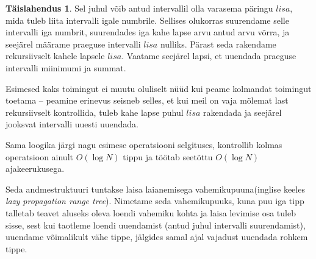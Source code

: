 \documentclass{trkut}
\theoremstyle{definition}
\newtheorem*{solution}{Täislahendus}
\begin{document}
\begin{solution}
Sel juhul võib antud intervallil olla varasema päringu $lisa$, mida tuleb liita intervalli igale numbrile. Sellises olukorras suurendame selle intervalli iga numbrit, suurendades iga kahe lapse arvu antud arvu võrra, ja seejärel määrame praeguse intervalli $lisa$ nulliks. Pärast seda rakendame rekursiivselt kahele lapsele $lisa$. Vaatame seejärel lapsi, et uuendada praeguse intervalli miinimumi ja summat.

Esimesed kaks toimingut ei muutu oluliselt nüüd kui peame kolmandat toimingut toetama -- peamine erinevus seisneb selles, et kui meil on vaja mõlemat last rekursiivselt kontrollida, tuleb kahe lapse puhul $lisa$ rakendada ja seejärel jooksvat intervalli uuesti uuendada.

Sama loogika järgi nagu esimese operatsiooni selgituses, kontrollib kolmas operatsioon ainult $O(\log N)$ tippu ja töötab seetõttu $O(\log N)$ ajakeerukusega.

Seda andmestruktuuri tuntakse laisa laianemisega vahemikupuuna(inglise keeles\textit{ lazy propagation range tree}). Nimetame seda vahemikupuuks, kuna puu iga tipp talletab teavet aluseks oleva loendi vahemiku kohta ja laisa levimise osa tuleb sisse, sest kui taotleme loendi uuendamist (antud juhul intervalli suurendamist), uuendame võimalikult vähe tippe, jälgides samal ajal vajadust uuendada rohkem tippe.

\end{solution}
\end{document}
